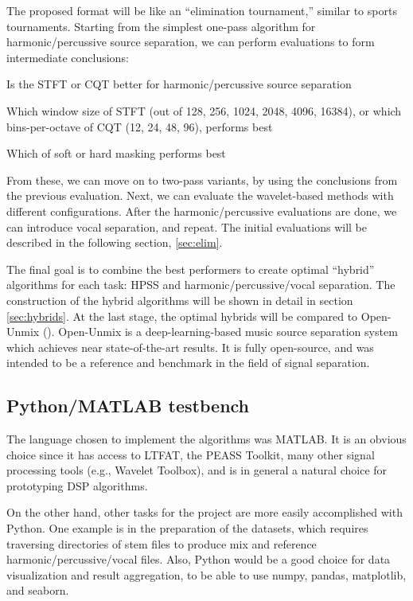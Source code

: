 \documentclass[10pt,letter]{article}
\newenvironment{tight_itemize}{
\begin{itemize}
\setlength{\itemsep}{0pt}
\setlength{\parskip}{0pt}
}{\end{itemize}}
\begin{document}
The proposed format will be like an ``elimination tournament,'' similar to sports tournaments. Starting from the simplest one-pass algorithm for harmonic/percussive source separation, we can perform evaluations to form intermediate conclusions:

\begin{tight_itemize}
\vspace{-0.5em}
\item
	Is the STFT or CQT better for harmonic/percussive source separation
\item
	Which window size of STFT (out of 128, 256, 1024, 2048, 4096, 16384), or which bins-per-octave of CQT (12, 24, 48, 96), performs best
\item
	Which of soft or hard masking performs best
\end{tight_itemize} 

From these, we can move on to two-pass variants, by using the conclusions from the previous evaluation. Next, we can evaluate the wavelet-based methods with different configurations. After the harmonic/percussive evaluations are done, we can introduce vocal separation, and repeat. The initial evaluations will be described in the following section, \ref{sec:elim}.

The final goal is to combine the best performers to create optimal ``hybrid'' algorithms for each task: HPSS and harmonic/percussive/vocal separation. The construction of the hybrid algorithms will be shown in detail in section \ref{sec:hybrids}. At the last stage, the optimal hybrids will be compared to Open-Unmix (\cite{umx}). Open-Unmix is a deep-learning-based music source separation system which achieves near state-of-the-art results. It is fully open-source, and was intended to be a reference and benchmark in the field of signal separation.

\subsection{Python/MATLAB testbench}

The language chosen to implement the algorithms was MATLAB. It is an obvious choice since it has access to LTFAT, the PEASS Toolkit, many other signal processing tools (e.g., Wavelet Toolbox), and is in general a natural choice for prototyping DSP algorithms.

On the other hand, other tasks for the project are more easily accomplished with Python. One example is in the preparation of the datasets, which requires traversing directories of stem files to produce mix and reference harmonic/percussive/vocal files. Also, Python would be a good choice for data visualization and result aggregation, to be able to use numpy\cite{numpy}, pandas\cite{pandas}, matplotlib\cite{matplotlib}, and seaborn\cite{seaborn}.
\end{document}
